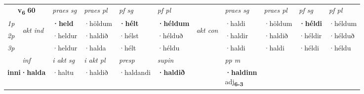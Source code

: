\noindent
\begin{tabular}{lllllllllll} \toprule
\multicolumn{2}{c}{\textbf{v{\textsubscript{6}}} \Large{\textbf{60}}}  &  \textit{praes sg}  & \textit{praes pl}  &\textit{ pf sg} & \textit{pf pl} &  &  \textit{praes sg}  & \textit{praes pl}  & \textit{pf sg} & \textit{pf pl } \\*
	\cmidrule{3-6} \cmidrule{8-11}
 {\textit{1p}} & \multirow{3}{*}{\begin{turn}{90}\textit{akt ind}\end{turn}} & \textbf{·held} & ·höldum & \textbf{·hélt} & \textbf{·héldum} & \multirow{3}{*}{\begin{turn}{90}\textit{akt con}\end{turn}} &·haldi & ·höldum & \textbf{·héldi} & ·héldum\\*
 {\textit{2p}} &  &  ·heldur  & ·haldið & ·hélst & ·hélduð & & ·haldir & ·haldið & ·héldir & ·hélduð \\*
{\textit{3p}} &  & ·heldur & ·halda & ·hélt & ·héldu & & ·haldi & ·haldi& ·héldi & ·héldu \\*
\cmidrule{3-6} \cmidrule{8-11}

   \multicolumn{2}{c}{\textit{inf}}  & \textit{i akt sg} & \textit{i akt pl}   & \textit{presp} & \textit{supin}  && \textit{pp m} \\*
  \multicolumn{2}{c}{\textbf{inni\allowbreak ·halda}} & ·haltu  & ·haldið   & ·haldandi &  \textbf{·haldið}  && \specialcell{\textbf{·haldinn} \\ adj\textbf{\textsubscript{6-3}}} \\*
\end{tabular}

